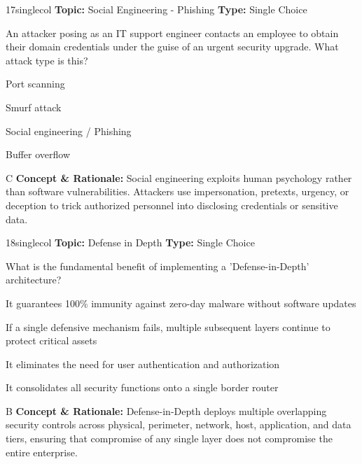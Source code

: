 \begin{qcard}{17}{singlecol}
\textcolor{darkslate!75}{\small\textbf{Topic:} Social Engineering - Phishing \hfill \textbf{Type:} Single Choice}\vspace{0.4em}\par
An attacker posing as an IT support engineer contacts an employee to obtain their domain credentials under the guise of an urgent security upgrade. What attack type is this?
\begin{qoptions}
\item Port scanning
\item Smurf attack
\item Social engineering / Phishing
\item Buffer overflow
\end{qoptions}
\end{qcard}
\nopagebreak
\begin{explainbox}{C}
\textbf{Concept \& Rationale:} Social engineering exploits human psychology rather than software vulnerabilities. Attackers use impersonation, pretexts, urgency, or deception to trick authorized personnel into disclosing credentials or sensitive data.
\end{explainbox}

\begin{qcard}{18}{singlecol}
\textcolor{darkslate!75}{\small\textbf{Topic:} Defense in Depth \hfill \textbf{Type:} Single Choice}\vspace{0.4em}\par
What is the fundamental benefit of implementing a 'Defense-in-Depth' architecture?
\begin{qoptions}
\item It guarantees 100\% immunity against zero-day malware without software updates
\item If a single defensive mechanism fails, multiple subsequent layers continue to protect critical assets
\item It eliminates the need for user authentication and authorization
\item It consolidates all security functions onto a single border router
\end{qoptions}
\end{qcard}
\nopagebreak
\begin{explainbox}{B}
\textbf{Concept \& Rationale:} Defense-in-Depth deploys multiple overlapping security controls across physical, perimeter, network, host, application, and data tiers, ensuring that compromise of any single layer does not compromise the entire enterprise.
\end{explainbox}

